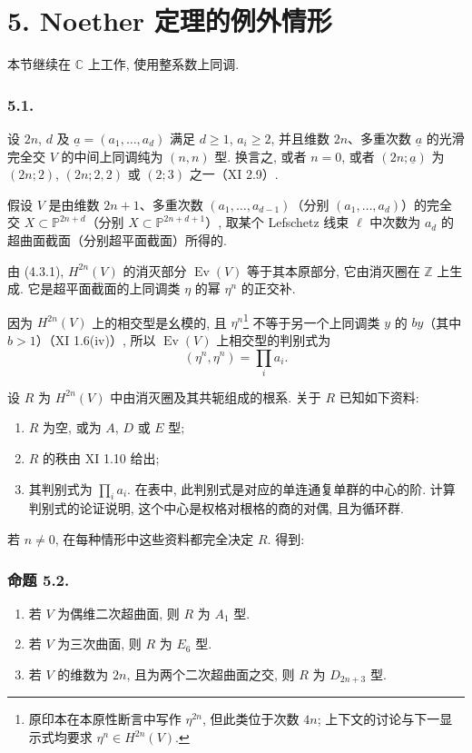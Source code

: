 \section*{5. Noether 定理的例外情形}

本节继续在 $\mathbb C$ 上工作, 使用整系数上同调.

\subsubsection*{5.1.}
设 $2n$, $d$ 及 $\underline a=(a_1,\ldots,a_d)$ 满足 $d\geq1$, $a_i\geq2$, 并且维数 $2n$、多重次数 $\underline a$ 的光滑完全交 $V$ 的中间上同调纯为 $(n,n)$ 型. 换言之, 或者 $n=0$, 或者 $(2n;\underline a)$ 为 $(2n;2)$, $(2n;2,2)$ 或 $(2;3)$ 之一（XI 2.9）.

假设 $V$ 是由维数 $2n+1$、多重次数 $(a_1,\ldots,a_{d-1})$（分别 $(a_1,\ldots,a_d)$）的完全交 $X\subset\mathbb P^{2n+d}$（分别 $X\subset\mathbb P^{2n+d+1}$）, 取某个 Lefschetz 线束 $\ell$ 中次数为 $a_d$ 的超曲面截面（分别超平面截面）所得的.

由 (4.3.1), $H^{2n}(V)$ 的消灭部分 $\operatorname{Ev}(V)$ 等于其本原部分, 它由消灭圈在 $\mathbb Z$ 上生成. 它是超平面截面的上同调类 $\eta$ 的幂 $\eta^n$ 的正交补.

因为 $H^{2n}(V)$ 上的相交型是幺模的, 且 $\eta^n$\footnote{原印本在本原性断言中写作 $\eta^{2n}$, 但此类位于次数 $4n$; 上下文的讨论与下一显示式均要求 $\eta^n\in H^{2n}(V)$.} 不等于另一个上同调类 $y$ 的 $b y$（其中 $b>1$）（XI 1.6(iv)）, 所以 $\operatorname{Ev}(V)$ 上相交型的判别式为
\[
 (\eta^n,\eta^n)=\prod_i a_i.
\]

设 $R$ 为 $H^{2n}(V)$ 中由消灭圈及其共轭组成的根系. 关于 $R$ 已知如下资料:
\begin{enumerate}[label=(\alph*)]
\item $R$ 为空, 或为 $A$, $D$ 或 $E$ 型;
\item $R$ 的秩由 XI 1.10 给出;
\item 其判别式为 $\prod_i a_i$. 在表中, 此判别式是对应的单连通复单群的中心的阶. 计算判别式的论证说明, 这个中心是权格对根格的商的对偶, 且为循环群.
\end{enumerate}

若 $n\ne0$, 在每种情形中这些资料都完全决定 $R$. 得到:

\subsubsection*{命题 5.2.}
\begin{enumerate}[label=(\roman*)]
\item 若 $V$ 为偶维二次超曲面, 则 $R$ 为 $A_1$ 型.
\item 若 $V$ 为三次曲面, 则 $R$ 为 $E_6$ 型.
\item 若 $V$ 的维数为 $2n$, 且为两个二次超曲面之交, 则 $R$ 为 $D_{2n+3}$ 型.
\end{enumerate}


